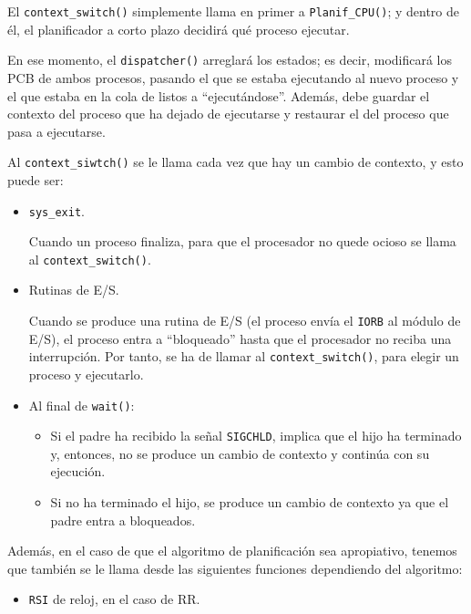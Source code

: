\begin{ejercicio}
\begin{enumerate}
        El \verb|context_switch()| simplemente llama en primer a \verb|Planif_CPU()|; y dentro de él, el planificador a corto plazo decidirá qué proceso ejecutar.
        
        En ese momento, el \verb|dispatcher()| arreglará los estados; es decir, modificará los PCB de ambos procesos, pasando el que se estaba ejecutando al nuevo proceso y el que estaba en la cola de listos a ``ejecutándose''. Además, debe guardar el contexto del proceso que ha dejado de ejecutarse y restaurar el del proceso que pasa a ejecutarse.

        Al \verb|context_siwtch()| se le llama cada vez que hay un cambio de contexto, y esto puede ser:
        \begin{itemize}
            \item \verb|sys_exit|.

            Cuando un proceso finaliza, para que el procesador no quede ocioso se llama al \verb|context_switch()|.

            \item Rutinas de E/S.

            Cuando se produce una rutina de E/S (el proceso envía el \verb|IORB| al módulo de E/S), el proceso entra a ``bloqueado'' hasta que el procesador no reciba una interrupción. Por tanto, se ha de llamar al \verb|context_switch()|, para elegir un proceso y ejecutarlo.
            
            \item Al final de \verb|wait()|:
            \begin{itemize}
                \item Si el padre ha recibido la señal \verb|SIGCHLD|, implica que el hijo ha terminado y, entonces, no se produce un cambio de contexto y continúa con su ejecución.

                \item Si no ha terminado el hijo, se produce un cambio de contexto ya que el padre entra a bloqueados.
            \end{itemize}
        \end{itemize}

        Además, en el caso de que el algoritmo de planificación sea apropiativo, tenemos que también se le llama desde las siguientes funciones dependiendo del algoritmo:
        \begin{itemize}
            \item \verb|RSI| de reloj, en el caso de RR.


\end{itemize}
\end{enumerate}
\end{ejercicio}
